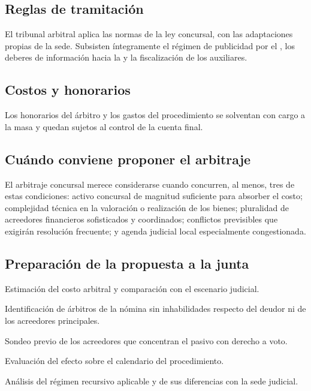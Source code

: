 \subsection{Reglas de tramitación}

El tribunal arbitral aplica las normas de la ley concursal, con las adaptaciones propias
de la sede. Subsisten íntegramente el régimen de publicidad por el \boletin{}, los
deberes de información hacia la \superir{} y la fiscalización de los auxiliares.

\subsection{Costos y honorarios}

Los honorarios del árbitro y los gastos del procedimiento se solventan con cargo a la
masa y quedan sujetos al control de la cuenta final.

\bloquePractico

\subsection{Cuándo conviene proponer el arbitraje}

\begin{foco}
El arbitraje concursal merece considerarse cuando concurren, al menos, tres de estas
condiciones: activo concursal de magnitud suficiente para absorber el costo; complejidad
técnica en la valoración o realización de los bienes; pluralidad de acreedores
financieros sofisticados y coordinados; conflictos previsibles que exigirán resolución
frecuente; y agenda judicial local especialmente congestionada.
\end{foco}

\subsection{Preparación de la propuesta a la junta}

\begin{checklist}
  \item Estimación del costo arbitral y comparación con el escenario judicial.
  \item Identificación de árbitros de la nómina sin inhabilidades respecto del deudor ni
  de los acreedores principales.
  \item Sondeo previo de los acreedores que concentran el pasivo con derecho a voto.
  \item Evaluación del efecto sobre el calendario del procedimiento.
  \item Análisis del régimen recursivo aplicable y de sus diferencias con la sede
  judicial.
\end{checklist}

